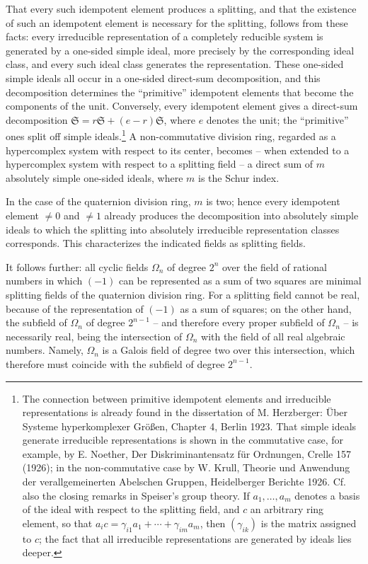 \documentclass[11pt]{article}
\providecommand{\mS}{\mathfrak{S}}
\begin{document}
That every such idempotent element produces a splitting, and that the existence of such an idempotent element is necessary for the splitting, follows from these facts: every irreducible representation of a completely reducible system is generated by a one-sided simple ideal, more precisely by the corresponding ideal class, and every such ideal class generates the representation. These one-sided simple ideals all occur in a one-sided direct-sum decomposition, and this decomposition determines the ``primitive'' idempotent elements that become the components of the unit. Conversely, every idempotent element gives a direct-sum decomposition $\mS=r\mS+(e-r)\mS$, where $e$ denotes the unit; the ``primitive'' ones split off simple ideals.\footnote{The connection between primitive idempotent elements and irreducible representations is already found in the dissertation of M. Herzberger: Über Systeme hyperkomplexer Größen, Chapter 4, Berlin 1923. That simple ideals generate irreducible representations is shown in the commutative case, for example, by E. Noether, Der Diskriminantensatz für Ordnungen, Crelle 157 (1926); in the non-commutative case by W. Krull, Theorie und Anwendung der verallgemeinerten Abelschen Gruppen, Heidelberger Berichte 1926. Cf. also the closing remarks in Speiser's group theory. If $a_1,\ldots,a_m$ denotes a basis of the ideal with respect to the splitting field, and $c$ an arbitrary ring element, so that $a_i c=\gamma_{i1}a_1+\cdots+\gamma_{im}a_m$, then $(\gamma_{ik})$ is the matrix assigned to $c$; the fact that all irreducible representations are generated by ideals lies deeper.} A non-commutative division ring, regarded as a hypercomplex system with respect to its center, becomes -- when extended to a hypercomplex system with respect to a splitting field -- a direct sum of $m$ absolutely simple one-sided ideals, where $m$ is the Schur index.

In the case of the quaternion division ring, $m$ is two; hence every idempotent element $\ne0$ and $\ne1$ already produces the decomposition into absolutely simple ideals to which the splitting into absolutely irreducible representation classes corresponds. This characterizes the indicated fields as splitting fields.

It follows further: all cyclic fields $\Omega_n$ of degree $2^n$ over the field of rational numbers in which $(-1)$ can be represented as a sum of two squares are minimal splitting fields of the quaternion division ring. For a splitting field cannot be real, because of the representation of $(-1)$ as a sum of squares; on the other hand, the subfield of $\Omega_n$ of degree $2^{n-1}$ -- and therefore every proper subfield of $\Omega_n$ -- is necessarily real, being the intersection of $\Omega_n$ with the field of all real algebraic numbers. Namely, $\Omega_n$ is a Galois field of degree two over this intersection, which therefore must coincide with the subfield of degree $2^{n-1}$.
\end{document}
